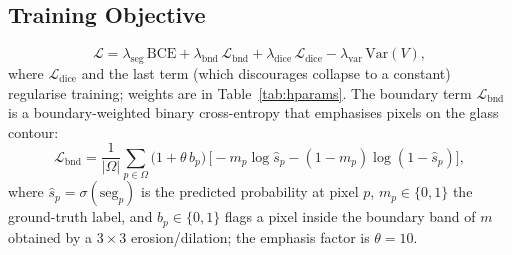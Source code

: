 \subsection{Training Objective}
\begin{equation}
\mathcal{L}=\lambda_{\mathrm{seg}}\,\mathrm{BCE}
+\lambda_{\mathrm{bnd}}\,\mathcal{L}_{\mathrm{bnd}}
+\lambda_{\mathrm{dice}}\,\mathcal{L}_{\mathrm{dice}}
-\lambda_{\mathrm{var}}\,\mathrm{Var}(V),
\end{equation}
where $\mathcal{L}_{\mathrm{dice}}$ \cite{milletari2016vnet} and the last term
(which discourages \ofcv{} collapse to a constant) regularise training; weights
are in Table~\ref{tab:hparams}. The boundary term
$\mathcal{L}_{\mathrm{bnd}}$ is a boundary-weighted binary cross-entropy that
emphasises pixels on the glass contour:
\begin{equation}
\mathcal{L}_{\mathrm{bnd}}=\frac{1}{|\Omega|}\sum_{p\in\Omega}
\big(1+\theta\,b_p\big)\,
\big[-m_p\log\hat{s}_p-(1-m_p)\log(1-\hat{s}_p)\big],
\end{equation}
where $\hat{s}_p=\sigma(\mathrm{seg}_p)$ is the predicted probability at pixel
$p$, $m_p\in\{0,1\}$ the ground-truth label, and $b_p\in\{0,1\}$ flags a pixel
inside the boundary band of $m$ obtained by a $3\times3$ erosion/dilation; the
emphasis factor is $\theta=10$.

